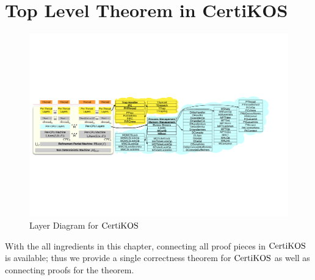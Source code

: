 \section{Top Level Theorem in CertiKOS}
\label{chapter:certikos:sec:top-level-theorem}


\begin{figure}
\includegraphics[width=\textwidth]{figs/certikos/layer_diagram}
\caption{Layer Diagram for $\mathrm{CertiKOS}$}
\label{fig:chapter:certikos:layer-diagram-for-certikos}
\end{figure}


With the all ingredients in this chapter, 
connecting all proof pieces in $\mathrm{CertiKOS}$ is available;
thus we provide a single correctness theorem for $\mathrm{CertiKOS}$
as well as connecting proofs
for the theorem.


